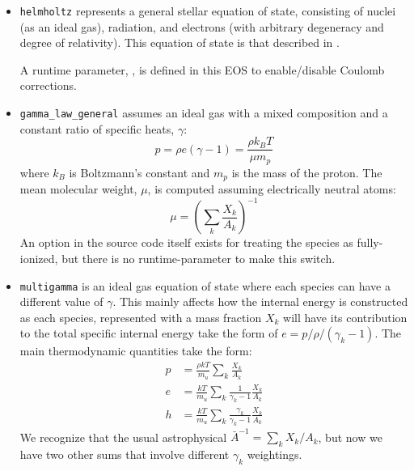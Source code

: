 \begin{itemize}
\item {\tt helmholtz} represents a general stellar equation 
      of state, consisting of nuclei (as an ideal gas), radiation,
      and electrons (with arbitrary degeneracy and degree of relativity).
      This equation of state is that described in \cite{timmes_eos}.

      A runtime parameter, , is defined in
      this EOS to enable/disable Coulomb corrections.

\item {\tt gamma\_law\_general} assumes an ideal gas with a mixed 
     composition and a constant ratio of specific heats, $\gamma$:
      \begin{equation}
      p = \rho e (\gamma - 1) = \frac{\rho k_B T}{\mu m_p} 
      \end{equation}
     where $k_B$ is Boltzmann's constant and $m_p$ is the mass of the
     proton.
     The mean molecular weight, $\mu$, is computed assuming 
     electrically neutral atoms:
     \begin{equation}
     \mu = \left ( \sum_k \frac{X_k}{A_k} \right )^{-1}
     \end{equation}
     An option in the source code itself exists for treating the
     species as fully-ionized, but there is no runtime-parameter to
     make this switch.

\item {\tt multigamma} is an ideal gas equation of state where each
  species can have a different value of $\gamma$.  This mainly affects
  how the internal energy is constructed as each species, represented
  with a mass fraction $X_k$ will have its contribution to the total
  specific internal energy take the form of $e = p/\rho/(\gamma_k -                                               
  1)$.  The main thermodynamic quantities take the form:
\begin{align}
p &= \frac{\rho k T}{m_u} \sum_k \frac{X_k}{A_k} \\
e &= \frac{k T}{m_u} \sum_k \frac{1}{\gamma_k - 1} \frac{X_k}{A_k} \\
h &= \frac{k T}{m_u} \sum_k \frac{\gamma_k}{\gamma_k - 1} \frac{X_k}{A_k}
\end{align}
We recognize that the usual astrophysical $\bar{A}^{-1} = \sum_k                                                  
X_k/A_k$, but now we have two other sums that involve different
$\gamma_k$ weightings.


\end{itemize}

